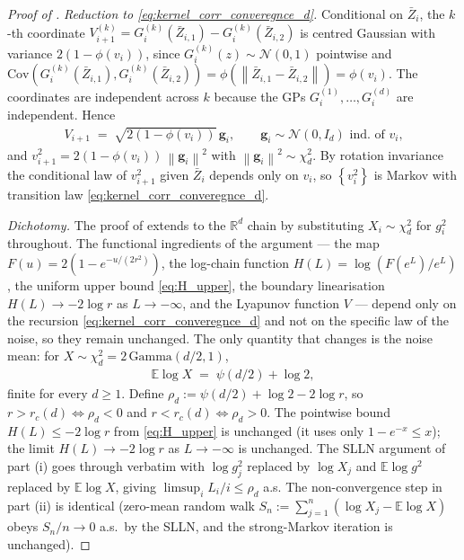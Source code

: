 \documentclass{article}
\newcommand{\RR}{\mathbb{R}}
\newcommand{\Set}[1]{\left\{ #1 \right\}}
\newcommand{\Exp}[1]{\mathbb{E} #1}
\newcommand{\norm}[1]{\left\|#1\right\|}
\newcommand{\mcN}{\mathcal{N}}
\newcommand{\bZ}{\bar{Z}}
\newcommand{\bg}{\mathbf{g}}
\newcommand{\Cov}{\mathrm{Cov}}
\begin{document}
\begin{proof}[Proof of ]
  \emph{Reduction to \eqref{eq:kernel_corr_converegnce_d}.} Conditional on $\bZ_i$, the $k$-th coordinate $V_{i+1}^{(k)} = G_i^{(k)}(\bZ_{i,1}) - G_i^{(k)}(\bZ_{i,2})$ is centred Gaussian with variance $2(1 - \phi(v_i))$, since $G_i^{(k)}(z) \sim \mcN(0,1)$ pointwise and $\Cov(G_i^{(k)}(\bZ_{i,1}), G_i^{(k)}(\bZ_{i,2})) = \phi(\norm{\bZ_{i,1} - \bZ_{i,2}}) = \phi(v_i)$. The coordinates are independent across $k$ because the GPs $G_i^{(1)},\ldots,G_i^{(d)}$ are independent. Hence
  \begin{eqnarray*}
    V_{i+1} \;=\; \sqrt{2(1-\phi(v_i))}\,\bg_i, \qquad \bg_i \sim \mcN(0, I_d) \text{ ind.\ of $v_i$,}
  \end{eqnarray*}
  and $v_{i+1}^2 = 2(1-\phi(v_i))\,\norm{\bg_i}^2$ with $\norm{\bg_i}^2 \sim \chi^2_d$. By rotation invariance the conditional law of $v_{i+1}^2$ given $\bZ_i$ depends only on $v_i$, so $\Set{v_i^2}$ is Markov with transition law \eqref{eq:kernel_corr_converegnce_d}.

  \emph{Dichotomy.} The proof of  extends to the $\RR^d$ chain by substituting $X_i \sim \chi^2_d$ for $g_i^2$ throughout. The functional ingredients of the argument --- the map $F(u) = 2(1 - e^{-u/(2r^2)})$, the log-chain function $H(L) = \log(F(e^L)/e^L)$, the uniform upper bound \eqref{eq:H_upper}, the boundary linearisation $H(L) \to -2\log r$ as $L \to -\infty$, and the Lyapunov function $V$ --- depend only on the recursion \eqref{eq:kernel_corr_converegnce_d} and not on the specific law of the noise, so they remain unchanged. The only quantity that changes is the noise mean: for $X \sim \chi^2_d = 2\,\mathrm{Gamma}(d/2,1)$,
  \begin{eqnarray*}
    \Exp{\log X} \;=\; \psi(d/2) + \log 2,
  \end{eqnarray*}
  finite for every $d \ge 1$. Define $\rho_d := \psi(d/2) + \log 2 - 2\log r$, so $r > r_c(d) \iff \rho_d < 0$ and $r < r_c(d) \iff \rho_d > 0$. The pointwise bound $H(L) \le -2\log r$ from \eqref{eq:H_upper} is unchanged (it uses only $1 - e^{-x} \le x$); the limit $H(L) \to -2\log r$ as $L \to -\infty$ is unchanged. The SLLN argument of part (i) goes through verbatim with $\log g_j^2$ replaced by $\log X_j$ and $\Exp{\log g^2}$ replaced by $\Exp{\log X}$, giving $\limsup_i L_i / i \le \rho_d$ a.s. The non-convergence step in part (ii) is identical (zero-mean random walk $S_n := \sum_{j=1}^n (\log X_j - \Exp{\log X})$ obeys $S_n / n \to 0$ a.s.\ by the SLLN, and the strong-Markov iteration is unchanged).


\end{proof}
\end{document}
